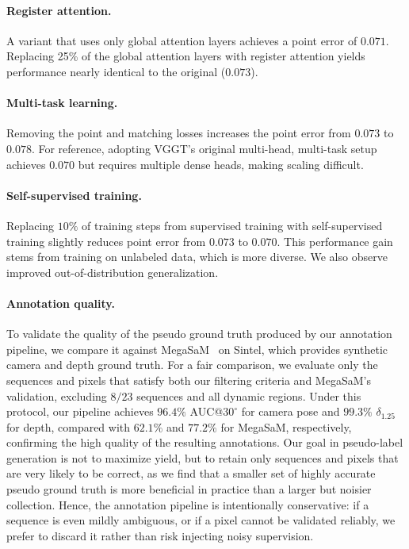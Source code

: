 \paragraph{Register attention.}

A variant that uses only global attention layers achieves a point error of $0.071$.
Replacing 25\% of the global attention layers with register attention yields performance nearly identical to the original ($0.073$).

\paragraph{Multi-task learning.}

Removing the point and matching losses increases the point error from $0.073$ to $0.078$.
For reference, adopting VGGT's original multi-head, multi-task setup achieves $0.070$ but requires multiple dense heads, making scaling difficult.

\paragraph{Self-supervised training.}

Replacing $10\%$ of training steps from supervised training with self-supervised training slightly reduces point error from $0.073$ to $0.070$.
This performance gain stems from training on unlabeled data, which is more diverse.
We also observe improved out-of-distribution generalization.

\paragraph{Annotation quality.}

To validate the quality of the pseudo ground truth produced by our annotation pipeline, we compare it against MegaSaM~\cite{li25megasam:} on Sintel, which provides synthetic camera and depth ground truth.
For a fair comparison, we evaluate only the sequences and pixels that satisfy both our filtering criteria and MegaSaM's validation, excluding $8/23$ sequences and all dynamic regions.
Under this protocol, our pipeline achieves $96.4\%$ AUC@$30^\circ$ for camera pose and $99.3\%$ $\delta_{1.25}$ for depth, compared with $62.1\%$ and $77.2\%$ for MegaSaM, respectively, confirming the high quality of the resulting annotations.
Our goal in pseudo-label generation is not to maximize yield, but to retain only sequences and pixels that are very likely to be correct, as we find that a smaller set of highly accurate pseudo ground truth is more beneficial in practice than a larger but noisier collection.
Hence, the annotation pipeline is intentionally conservative: if a sequence is even mildly ambiguous, or if a pixel cannot be validated reliably, we prefer to discard it rather than risk injecting noisy supervision.


